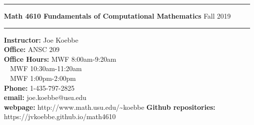 \documentclass[10pt,fleqn]{article}
\begin{document}
%
\pagestyle{empty}
\vskip0.1in\hrule\vskip0.1in \noindent
{\bf
   Math 4610 Fundamentals of Computational Mathematics
} \hfill Fall 2019
\vskip0.1in\hrule\vskip0.1in
\noindent
{\bf Instructor:} \hfill   Joe Koebbe \\
\smallskip\noindent
{\bf Office:}     \hfill   ANSC 209 \\
\smallskip\noindent
{\bf Office Hours:} \hfill MWF 8:00am-9:20am \\
\smallskip\noindent
{\bf \ } \hfill MWF 10:30am-11:20am \\
\smallskip\noindent
{\bf \ } \hfill MWF 1:00pm-2:00pm \\
\smallskip\noindent
{\bf Phone:}      \hfill   1-435-797-2825 \\
\smallskip\noindent
{\bf email:}      \hfill   joe.koebbe@usu.edu \\
\smallskip\noindent
{\bf webpage:}    \hfill   http://www.math.usu.edu/\~{}koebbe
\smallskip\noindent
{\bf Github repositories:}    \hfill   https://jvkoebbe.github.io/math4610
\end{document}
